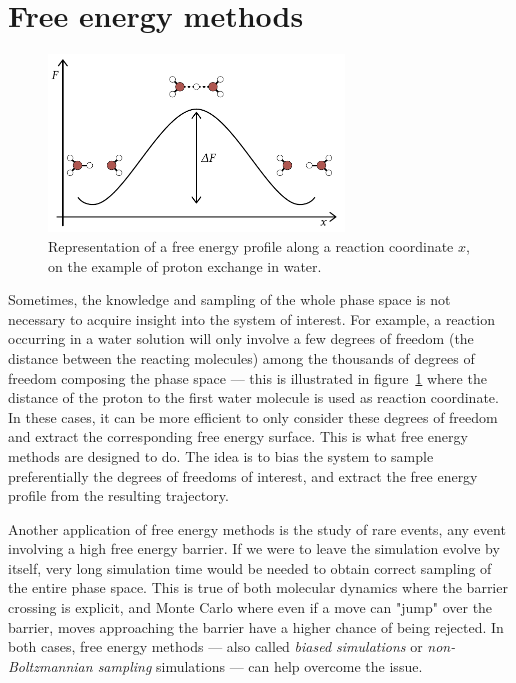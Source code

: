 \documentclass[thesis]{subfiles}
\begin{document}
\newpage
\section{Free energy methods}

\begin{figure}[ht]
    \centering
    \includegraphics[width=0.7\textwidth]{figures/images/free-energy-profile}
    \caption{Representation of a free energy profile along a reaction
    coordinate $x$, on the example of proton exchange in water.}
    \label{fig:free-energy-profile}
\end{figure}

Sometimes, the knowledge and sampling of the whole phase space is not necessary
to acquire insight into the system of interest. For example, a reaction occurring
in a water solution will only involve a few degrees of freedom (the distance
between the reacting molecules) among the thousands of degrees of freedom
composing the phase space --- this is illustrated in
figure~\ref{fig:free-energy-profile} where the distance of the proton to the
first water molecule is used as reaction coordinate. In these cases, it
can be more efficient to only consider these degrees of freedom and extract the
corresponding free energy surface. This is what free energy methods are designed
to do. The idea is to bias the system to sample preferentially the degrees of
freedoms of interest, and extract the free energy profile from the resulting
trajectory.

Another application of free energy methods is the study of rare events, \ie any
event involving a high free energy barrier. If we were to leave the simulation
evolve by itself, very long simulation time would be needed to obtain correct
sampling of the entire phase space. This is true of both molecular dynamics
where the barrier crossing is explicit, and Monte Carlo where even if a move can
"jump" over the barrier, moves approaching the barrier have a higher chance of
being rejected. In both cases, free energy methods --- also called \emph{biased
simulations} or \emph{non-Boltzmannian sampling} simulations --- can help
overcome the issue.
\end{document}
